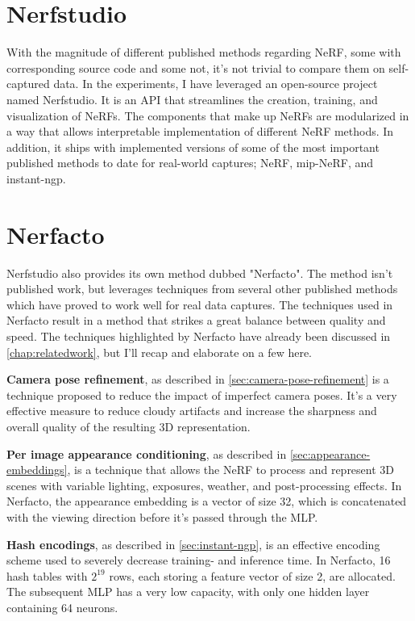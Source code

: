 \section{Nerfstudio}
With the magnitude of different published methods regarding NeRF, some with corresponding source code and some not, it's not trivial to compare them on self-captured data. In the experiments, I have leveraged an open-source project named Nerfstudio. It is an API that streamlines the creation, training, and visualization of NeRFs. The components that make up NeRFs are modularized in a way that allows interpretable implementation of different NeRF methods. In addition, it ships with implemented versions of some of the most important published methods to date for real-world captures; NeRF, mip-NeRF, and instant-ngp.

\section{Nerfacto}

Nerfstudio also provides its own method dubbed "Nerfacto". The method isn't published work, but leverages techniques from several other published methods which have proved to work well for real data captures. The techniques used in Nerfacto result in a method that strikes a great balance between quality and speed. The techniques highlighted by Nerfacto have already been discussed in \autoref{chap:relatedwork}, but I'll recap and elaborate on a few here.

\textbf{Camera pose refinement}, as described in \autoref{sec:camera-pose-refinement} is a technique proposed to reduce the impact of imperfect camera poses. It's a very effective measure to reduce cloudy artifacts and increase the sharpness and overall quality of the resulting 3D representation.

\textbf{Per image appearance conditioning}, as described in \autoref{sec:appearance-embeddings}, is a technique that allows the NeRF to process and represent 3D scenes with variable lighting, exposures, weather, and post-processing effects. In Nerfacto, the appearance embedding is a vector of size 32, which is concatenated with the viewing direction before it's passed through the MLP.

\textbf{Hash encodings}, as described in \autoref{sec:instant-ngp}, is an effective encoding scheme used to severely decrease training- and inference time. In Nerfacto, 16 hash tables with $2^{19}$ rows, each storing a feature vector of size 2, are allocated. The subsequent MLP has a very low capacity, with only one hidden layer containing 64 neurons.

